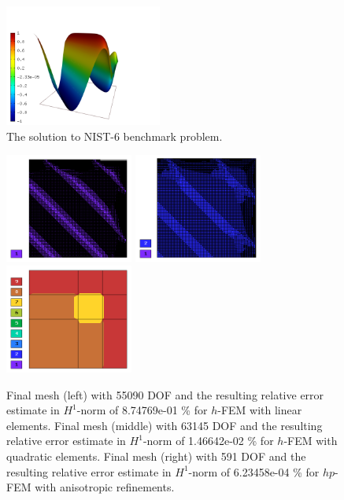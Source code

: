 \documentclass[12pt]{elsarticle}
\begin{document}
\begin{figure}[H]
\centering
\includegraphics[height=4cm]{nist/nist-6/solution.png}
\caption{The solution to NIST-6 benchmark problem.}
\label{fig:sln-nist06}
\end{figure}

\begin{figure}[H]
\centering
\vspace{-5mm}
\includegraphics[height=3.6cm]{nist/nist-6/mesh_h1_aniso.png}
\includegraphics[height=3.6cm]{nist/nist-6/mesh_h2_aniso.png}
\includegraphics[height=3.6cm]{nist/nist-6/mesh_hp_aniso.png}
\vspace{-5mm}
\caption{
Final mesh (left) with 55090 DOF and the resulting
relative error estimate in $H^1$-norm of 8.74769e-01 \% for $h$-FEM with linear elements.
Final mesh (middle) with 63145 DOF and the resulting
relative error estimate in $H^1$-norm of 1.46642e-02 \% for $h$-FEM with quadratic elements.
Final mesh (right) with 591 DOF and the resulting
relative error estimate in $H^1$-norm of 6.23458e-04 \% for $hp$-FEM with anisotropic refinements.}
\vspace{-5mm}
\label{fig:nist-6-hp-aniso}
\end{figure}
\end{document}
